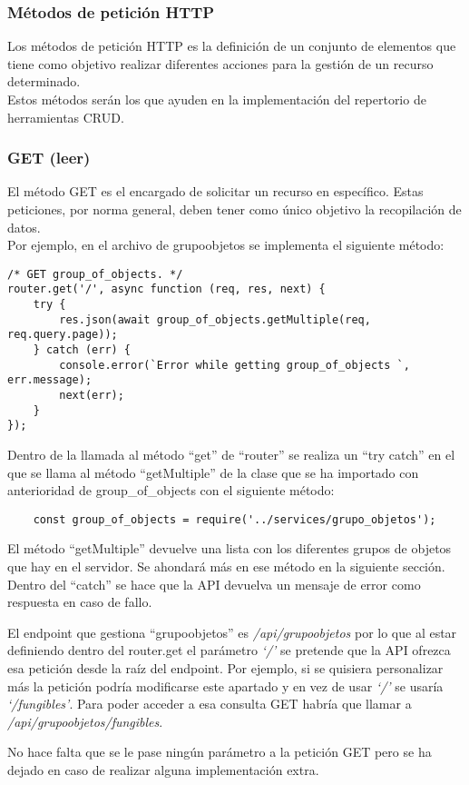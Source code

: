 \subsubsection{Métodos de petición HTTP}
Los métodos de petición HTTP es la definición de un conjunto de elementos que tiene como objetivo realizar diferentes acciones para la gestión de un recurso determinado.
\\Estos métodos serán los que ayuden en la implementación del repertorio de herramientas CRUD.

\subsubsection{GET (leer)}
El método GET es el encargado de solicitar un recurso en específico. Estas peticiones, por norma general, deben tener como único objetivo la recopilación de datos.
\\Por ejemplo, en el archivo de grupoobjetos se implementa el siguiente método:
\begin{verbatim}
/* GET group_of_objects. */
router.get('/', async function (req, res, next) {
    try {
        res.json(await group_of_objects.getMultiple(req, req.query.page));
    } catch (err) {
        console.error(`Error while getting group_of_objects `, err.message);
        next(err);
    }
});
\end{verbatim}
Dentro de la llamada al método ``get'' de ``router'' se realiza un ``try catch'' en el que se llama al método ``getMultiple'' de la clase que se ha importado con anterioridad de group\_of\_objects con el siguiente método:
\begin{verbatim}
    const group_of_objects = require('../services/grupo_objetos');
\end{verbatim}
El método ``getMultiple'' devuelve una lista con los diferentes grupos de objetos que hay en el servidor. Se ahondará más en ese método en la siguiente sección.
\\Dentro del ``catch'' se hace que la API devuelva un mensaje de error como respuesta en caso de fallo.
\begin{tcolorbox}
    [colback=green!5!white,colframe=green!75!black,fonttitle=\bfseries,title=Personalización de peticiones]
    El endpoint que gestiona ``grupoobjetos'' es \textit{/api/grupoobjetos} por lo que al estar definiendo dentro del router.get el parámetro \textit{`/'} se pretende que la API ofrezca esa petición desde la raíz del endpoint. Por ejemplo, si se quisiera personalizar más la petición podría modificarse este apartado y en vez de usar \textit{`/'} se usaría \textit{`/fungibles'}. Para poder acceder a esa consulta GET habría que llamar a \textit{/api/grupoobjetos/fungibles}.
\end{tcolorbox}
No hace falta que se le pase ningún parámetro a la petición GET pero se ha dejado en caso de realizar alguna implementación extra.

